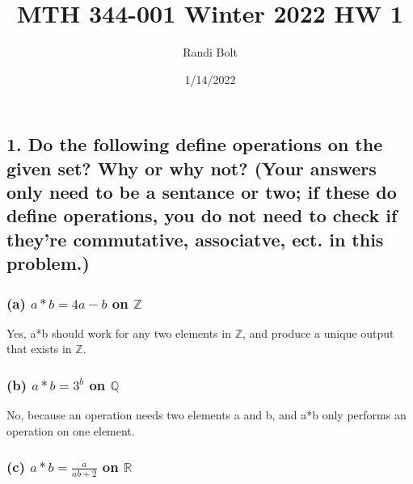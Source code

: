 \documentclass[
]{article}
\title{MTH 344-001 Winter 2022 HW 1}
\author{Randi Bolt}
\date{1/14/2022}
\begin{document}
\maketitle

\hypertarget{do-the-following-define-operations-on-the-given-set-why-or-why-not-your-answers-only-need-to-be-a-sentance-or-two-if-these-do-define-operations-you-do-not-need-to-check-if-theyre-commutative-associatve-ect.-in-this-problem.}{%
\subsection{1. Do the following define operations on the given set? Why
or why not? (Your answers only need to be a sentance or two; if these do
define operations, you do not need to check if they're commutative,
associatve, ect. in this
problem.)}\label{do-the-following-define-operations-on-the-given-set-why-or-why-not-your-answers-only-need-to-be-a-sentance-or-two-if-these-do-define-operations-you-do-not-need-to-check-if-theyre-commutative-associatve-ect.-in-this-problem.}}

\hypertarget{a-ab4a-b-on-mathbbz}{%
\subsubsection{\texorpdfstring{(a) \(a*b=4a-b\) on
\(\mathbb{Z}\)}{(a) a*b=4a-b on \textbackslash mathbb\{Z\}}}\label{a-ab4a-b-on-mathbbz}}

Yes, a*b should work for any two elements in \(\mathbb{Z}\), and produce
a unique output that exists in \(\mathbb{Z}\).

\hypertarget{b-ab3b-on-mathbbq}{%
\subsubsection{\texorpdfstring{(b) \(a*b=3^b\) on
\(\mathbb{Q}\)}{(b) a*b=3\^{}b on \textbackslash mathbb\{Q\}}}\label{b-ab3b-on-mathbbq}}

No, because an operation needs two elements a and b, and a*b only
performs an operation on one element.

\hypertarget{c-abfracaab2-on-mathbbr}{%
\subsubsection{\texorpdfstring{(c) \(a*b=\frac{a}{ab+2}\) on
\(\mathbb{R}\)}{(c) a*b=\textbackslash frac\{a\}\{ab+2\} on \textbackslash mathbb\{R\}}}\label{c-abfracaab2-on-mathbbr}}
\end{document}

